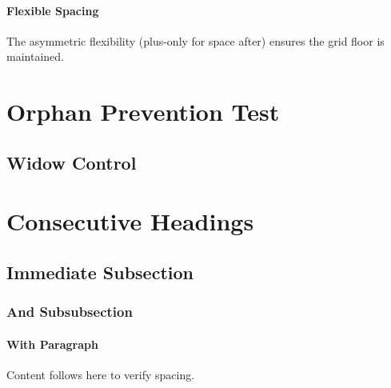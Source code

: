 \documentclass[11pt,a4paper]{article}
\begin{document}
\paragraph{Flexible Spacing}
The asymmetric flexibility (plus-only for space after) ensures the grid floor is maintained.

\section{Orphan Prevention Test}
\lipsum[5-6]

\subsection{Widow Control}
\lipsum[7-8]

\section{Consecutive Headings}
\subsection{Immediate Subsection}
\subsubsection{And Subsubsection}
\paragraph{With Paragraph}
Content follows here to verify spacing.
\end{document}
